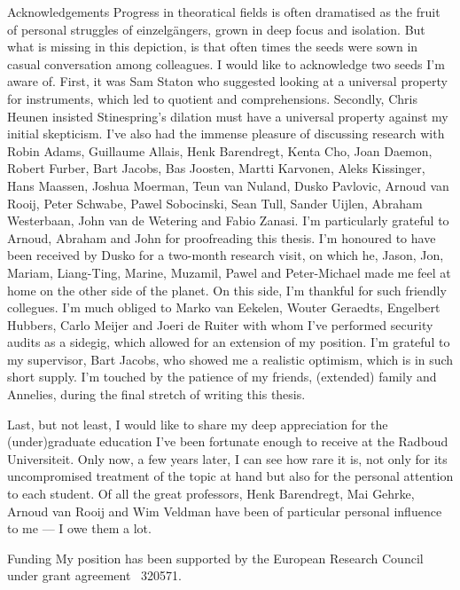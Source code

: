 \documentclass[b]{subfiles}
\begin{document}
\begin{parsec}
\begin{point}{Acknowledgements}%
Progress in theoratical fields
    is often dramatised
    as the fruit of personal struggles of  einzelg\"angers,
    grown in deep focus and isolation.
But what is missing in this depiction, is that
    often times  the seeds were sown
    in casual conversation among colleagues.
I would like to acknowledge two seeds I'm aware of.
First, it was Sam Staton who suggested looking at a universal property
    for instruments, which led to quotient and comprehensions.
Secondly, Chris Heunen insisted Stinespring's dilation must have a
    universal property against my initial skepticism.
I've also had the immense pleasure of discussing research with
    Robin Adams,
    Guillaume Allais,
    Henk Barendregt,
    Kenta Cho,
    Joan Daemon,
    Robert Furber,
    Bart Jacobs,
    Bas Joosten,
    Martti Karvonen,
    Aleks Kissinger,
    Hans Maassen,
    Joshua Moerman,
    Teun van Nuland,
    Dusko Pavlovic,
    Arnoud van Rooij,
    Peter Schwabe,
    Pawel Sobocinski,
    Sean Tull,
    Sander Uijlen,
    Abraham Westerbaan,
    John van de Wetering and
    Fabio Zanasi.
I'm particularly grateful to Arnoud, Abraham and John
    for proofreading this thesis.
I'm honoured to have been received by Dusko
    for a two-month research visit,
    on which he, Jason, Jon, Mariam, Liang-Ting, Marine, Muzamil, Pawel
    and Peter-Michael made me feel at home on the other side of the planet.
On this side, I'm thankful for such friendly collegues.
I'm much obliged to Marko van Eekelen,
    Wouter Geraedts,
    Engelbert Hubbers,
    Carlo Meijer and
    Joeri de Ruiter
    with whom I've performed security audits as a sidegig,
    which allowed for an extension of my position.
I'm grateful to my supervisor, Bart Jacobs,
    who showed me a realistic optimism,
    which is in such short supply.
I'm touched by the patience of my friends, (extended) family and Annelies,
    during the final stretch of writing this thesis.

Last, but not least, I would like to share my deep appreciation
    for the (under)graduate education
    I've been fortunate enough to receive at the Radboud Universiteit.
Only now, a few years later,
    I can see how rare it is,
    not only for its uncompromised treatment of the topic at hand
    but also for the personal attention to each student.
Of all the great professors,
Henk Barendregt,
    Mai Gehrke, Arnoud van Rooij and Wim Veldman
    have been of particular personal influence to me --- I owe them a lot.
\begin{point}{Funding}
My position has been supported by the
European Research Council under grant agreement \textnumero~320571.
\end{point}
\end{point}
\end{parsec}
\end{document}

